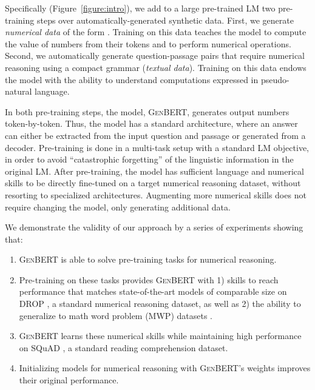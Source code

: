 \documentclass[11pt,a4paper]{article}
\newcommand\genbert{\textsc{GenBERT}}
\newcommand\drop{\textsc{DROP}}
\begin{document}
Specifically (Figure~\ref{figure:intro}), we add to a large pre-trained LM two pre-training steps over automatically-generated synthetic data. First, we generate \emph{numerical data} of the form . Training on this data teaches the model to compute the value of numbers from their tokens and to perform numerical operations. Second, we automatically generate question-passage pairs that require numerical reasoning using a compact grammar (\emph{textual data}). Training on this data endows the model with the ability to understand computations expressed in pseudo-natural language. 

In both pre-training steps, the model, \genbert{}, generates output numbers token-by-token. Thus, the model has a standard architecture, where an answer can either be extracted from the input question and passage or generated from a decoder. Pre-training is done in a multi-task setup with a standard LM objective, in order to avoid ``catastrophic forgetting'' \cite{kirkpatrick2017overcoming} of the linguistic information in the original LM. After pre-training, the model has sufficient language and numerical skills to be directly fine-tuned on a target numerical reasoning dataset, without resorting to specialized architectures. Augmenting more numerical skills does not require changing the model, only generating additional data.

We demonstrate the validity of our approach by a series of experiments showing that: 
\begin{enumerate}[label=(\alph*),leftmargin=*,topsep=0pt,itemsep=0pt,parsep=0pt]
    \item \genbert{} is able to solve pre-training tasks for numerical reasoning.
    \item Pre-training on these tasks provides \genbert{} with 1) skills to reach performance that matches state-of-the-art models of comparable size on \drop{} \cite{dua2019drop}, a standard numerical reasoning dataset, as well as 2) the ability to generalize to math word problem (MWP) datasets \cite{koncel2016mawps}.
    \item \genbert{} learns these numerical skills while maintaining high performance on SQuAD \cite{rajpurkar2016squad}, a standard reading comprehension dataset.
    \item Initializing models for numerical reasoning with \genbert{}'s weights improves their original performance.
\end{enumerate}
\end{document}
